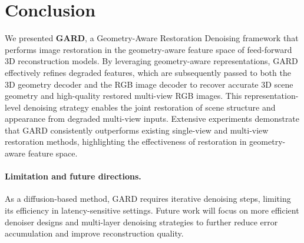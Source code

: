 \documentclass{llmxive}
\begin{document}
\section{Conclusion}
\label{sec:conclusion}

We presented \textbf{GARD}, a Geometry-Aware Restoration Denoising framework that performs image restoration in the geometry-aware feature space of feed-forward 3D reconstruction models. By leveraging geometry-aware representations, GARD effectively refines degraded features, which are subsequently passed to both the 3D geometry decoder and the RGB image decoder to recover accurate 3D scene geometry and high-quality restored multi-view RGB images. This representation-level denoising strategy enables the joint restoration of scene structure and appearance from degraded multi-view inputs. Extensive experiments demonstrate that GARD consistently outperforms existing single-view and multi-view restoration methods, highlighting the effectiveness of restoration in geometry-aware feature space.

\paragraph{Limitation and future directions.}
As a diffusion-based method, GARD requires iterative denoising steps, limiting its efficiency in latency-sensitive settings. Future work will focus on more efficient denoiser designs and multi-layer denoising strategies to further reduce error accumulation and improve reconstruction quality.

















\end{document}
